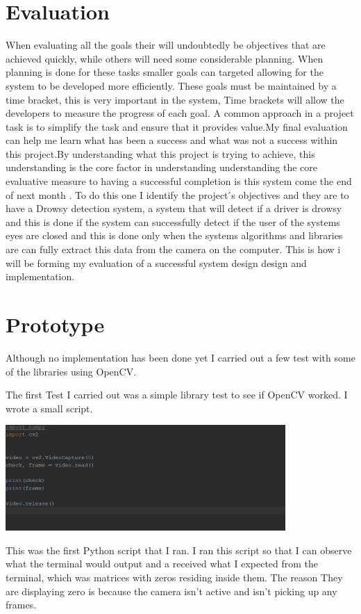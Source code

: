 \section{Evaluation}
When evaluating  all the goals their will undoubtedly be objectives that are achieved  quickly, while others will need some considerable  planning.  When planning is done for these tasks smaller goals can targeted allowing for the system to be developed more efficiently. These goals must  be maintained by a time bracket, this is very important in the system, Time brackets will allow the developers to measure the progress of each goal. A common approach in a project task is to simplify the task and ensure that it provides value.My final evaluation can help me learn what has been a success and what was  not  a success within this project.By understanding what this project is trying to achieve, this understanding is the core factor in understanding understanding the core evaluative measure to having a successful completion is this system come the end of next month .  To do this one I identify the project ́s objectives and they are to have a Drowsy detection system, a system that will detect if a driver is drowsy and this is done if the system can successfully detect if the user of the systems eyes are closed and this is done only when the systems algorithms and libraries are can fully extract this data from the camera on the computer. This is how i will be forming my evaluation of a successful system design design and implementation.


\section{Prototype}
Although no implementation has been done yet I carried out a few test with some of the libraries using OpenCV.

The first Test I carried out was a simple library test to see if OpenCV worked. I wrote a small script.

\includegraphics[width=0.8\textwidth]{Figures/Pythonscript.png}

This was the first Python script that I ran.  I ran this script so that I can observe what the terminal would output and a received what I expected from the terminal, which was matrices with zeros residing inside them. The reason They are displaying zero is because  the camera isn't active and isn't picking up any frames.

